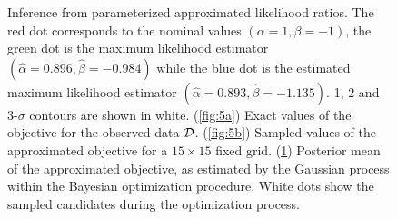 \documentclass[12pt]{article}
\numberwithin{equation}{section}
\theoremstyle{plain}
\begin{document}
\begin{figure}
\begin{subfigure}[t]{0.31\textwidth}
        \caption{ }
        \label{fig:5c}
    \end{subfigure}
    \caption{Inference from parameterized approximated likelihood ratios. The red dot corresponds
    to the nominal values $(\alpha=1, \beta=-1)$, the green dot is the maximum likelihood estimator
    $(\hat \alpha=0.896, \hat \beta=-0.984)$ while the blue dot is the estimated maximum likelihood estimator $(\hat \alpha=0.893, \hat \beta=-1.135)$.
    1, 2 and 3-$\sigma$ contours are shown in white.
             (\ref{fig:5a}) Exact values of the objective for the observed data ${\cal D}$.
             (\ref{fig:5b}) Sampled values of the approximated objective for a $15 \times 15$ fixed grid.
             (\ref{fig:5c}) Posterior mean of the approximated objective, as estimated by the Gaussian process within the Bayesian optimization procedure. White dots show the sampled candidates during the optimization process.}
    \label{fig:5}
\end{figure}
\end{document}
